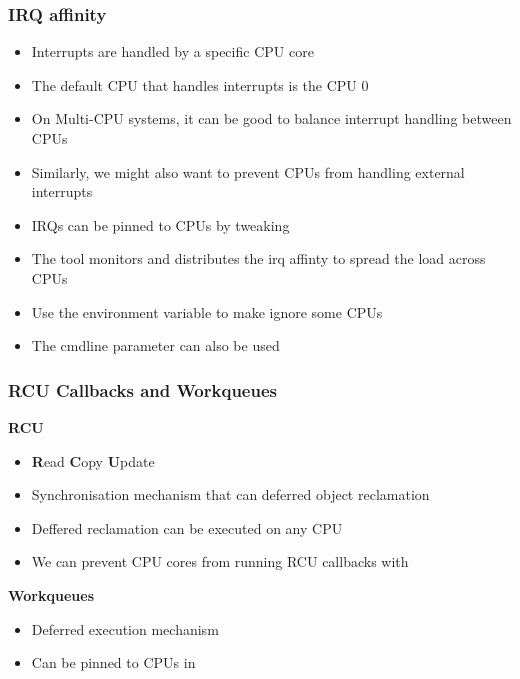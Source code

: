 \begin{frame}
        \frametitle{IRQ affinity}
        \begin{itemize}
                \item Interrupts are handled by a specific CPU core
                \item The default CPU that handles interrupts is the CPU 0
                \item On Multi-CPU systems, it can be good to balance interrupt handling between CPUs
                \item Similarly, we might also want to prevent CPUs from handling external interrupts
                \item IRQs can be pinned to CPUs by tweaking 
                \item The  tool monitors and distributes the irq affinty to spread the load across CPUs
                \item Use the  environment variable to make  ignore some CPUs
                \item The  cmdline parameter can also be used
        \end{itemize}
\end{frame}

\begin{frame}
        \frametitle{RCU Callbacks and Workqueues}
        \begin{center}\textbf{RCU}\end{center}
        \begin{itemize}
                \item \textbf{R}ead \textbf{C}opy \textbf{U}pdate
                \item Synchronisation mechanism that can deferred object reclamation
                \item Deffered reclamation can be executed on any CPU 
                \item We can prevent CPU cores from running RCU callbacks with 
        \end{itemize}
        \begin{center}\textbf{Workqueues}\end{center}
        \begin{itemize}
                \item Deferred execution mechanism
                \item Can be pinned to CPUs in 
        \end{itemize}
\end{frame}

